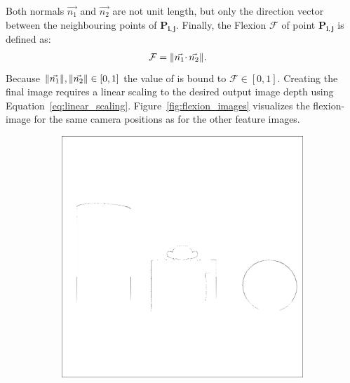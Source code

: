 Both normals $\vec{n_1}$ and $\vec{n_2}$ are not unit length, but only the direction vector between the neighbouring points of $\mathbf{P_{i,j}}$.
Finally, the Flexion $\mathcal{F}$ of point $\mathbf{P_{i,j}}$ is defined as:
\begin{align}
    \mathcal{F} &= \lVert\vec{n_1} \cdotp \vec{n_2}\rVert\text{.}
\end{align}
Because $\lVert\vec{n_1}\rVert,\lVert\vec{n_2}\rVert \in [0,1]$ the value of is bound to $\mathcal{F} \in [0, 1]$.
Creating the final image requires a linear scaling to the desired output image depth using Equation~\ref{eq:linear_scaling}.
Figure~\ref{fig:flexion_images} visualizes the \Gls{flexion-image} for the same camera positions as for the other feature images.
\begin{figure}[H]
    \begin{subfigure}[t]{0.32\textwidth}
        \includegraphics[width=\linewidth]{chapter04/img/flexion-0001.png}
    \end{subfigure}
    \begin{subfigure}[t]{0.32\textwidth}

\end{subfigure}
\end{figure}
